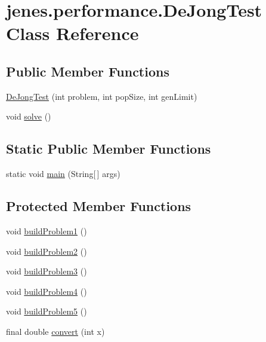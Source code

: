\hypertarget{classjenes_1_1performance_1_1_de_jong_test}{\section{jenes.\-performance.\-De\-Jong\-Test Class Reference}
\label{classjenes_1_1performance_1_1_de_jong_test}
}
\subsection*{Public Member Functions}
\begin{DoxyCompactItemize}
\item 
\hyperlink{classjenes_1_1performance_1_1_de_jong_test_a795332b956040573e1567a687b734c0f}{De\-Jong\-Test} (int problem, int pop\-Size, int gen\-Limit)
\item 
void \hyperlink{classjenes_1_1performance_1_1_de_jong_test_aac1afb2071483b28a6c55b62bfe32e31}{solve} ()
\end{DoxyCompactItemize}
\subsection*{Static Public Member Functions}
\begin{DoxyCompactItemize}
\item 
static void \hyperlink{classjenes_1_1performance_1_1_de_jong_test_ab226b971a6f791d5a49dd4c2718f81d7}{main} (String\mbox{[}$\,$\mbox{]} args)
\end{DoxyCompactItemize}
\subsection*{Protected Member Functions}
\begin{DoxyCompactItemize}
\item 
void \hyperlink{classjenes_1_1performance_1_1_de_jong_test_acd3c1b93304e2d46f53891a2bf82bf8b}{build\-Problem1} ()
\item 
void \hyperlink{classjenes_1_1performance_1_1_de_jong_test_ad444e70d87a8a65d868a08f836ddca44}{build\-Problem2} ()
\item 
void \hyperlink{classjenes_1_1performance_1_1_de_jong_test_a04ba560b3c32b954db4b0e2de7e0fea3}{build\-Problem3} ()
\item 
void \hyperlink{classjenes_1_1performance_1_1_de_jong_test_a1dd8d7b4740a0f65699bac3b7c64cebf}{build\-Problem4} ()
\item 
void \hyperlink{classjenes_1_1performance_1_1_de_jong_test_ad1282e40a9a1711898f700f17f90bcb0}{build\-Problem5} ()
\item 
final double \hyperlink{classjenes_1_1performance_1_1_de_jong_test_afd03d3c06d2c0a3ff64a384413e1c1fd}{convert} (int x)
\end{DoxyCompactItemize}
